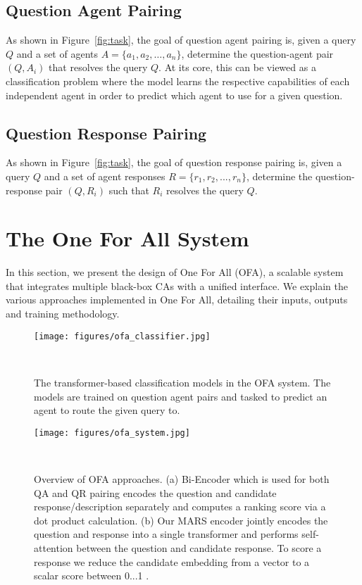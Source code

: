 \documentclass[11pt]{article}
\begin{document}
\subsection{Question Agent Pairing} \label{sec_qap}
As shown in Figure~\ref{fig:task}, the goal of question agent pairing is, given a query $Q$ and a set of agents $A = \{a_{1}, a_{2}, \ldots, a_{n}\}$, determine the question-agent pair $(Q, A_{i})$ that resolves the query $Q$. At its core, this can be viewed as a classification problem where the model learns the respective capabilities of each independent agent in order to predict which agent to use for a given question.

\subsection{Question Response Pairing}
As shown in Figure~\ref{fig:task}, the goal of question response pairing is, given a query $Q$ and a set of agent responses $R = \{r_{1}, r_{2}, ..., r_{n}\}$, determine the question-response pair $(Q, R_{i})$ such that $R_i$ resolves the query $Q$.


 \section{The One For All System}

In this section, we present the design of One For All (OFA), a scalable system that integrates multiple black-box CAs with a unified interface. We explain the various approaches implemented in One For All, detailing their inputs, outputs and training methodology.
 
  \begin{figure}
  \centering
  \texttt{[image: figures/ofa\_classifier.jpg]}
  \caption{The transformer-based classification models in the OFA system. The models are trained on question agent pairs and tasked to predict an agent to route the given query to.}
  ~\label{fig:classifier}
  \vspace{-2pc}
\end{figure}
 
\begin{figure*}
  \centering
  \texttt{[image: figures/ofa\_system.jpg]}
  \caption{Overview of OFA approaches. (a) Bi-Encoder which is used for both QA and QR pairing encodes the question and candidate response/description separately and computes a ranking score via a dot product calculation. (b) Our MARS encoder jointly encodes the question and response into a single transformer and performs self-attention between the question and candidate response. To score a response we reduce the candidate embedding from a vector to a scalar score between 0...1  \cite{Humeau2020Poly-encoders:}.}~\label{fig:system}
  \vspace{-1.8pc}
\end{figure*}
 
\end{document}
